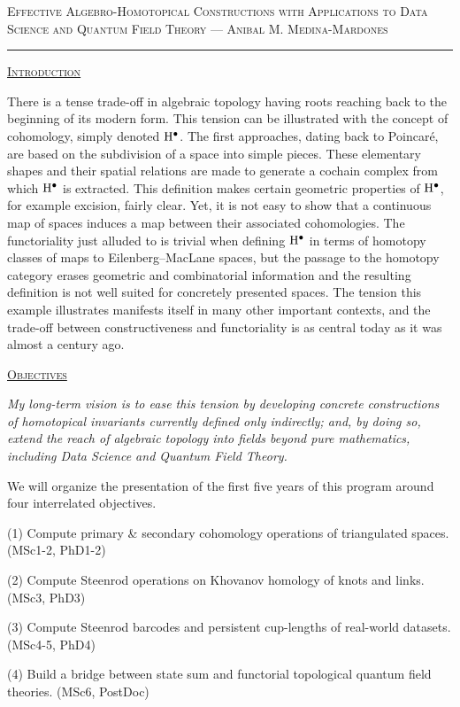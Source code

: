 
\vspace*{-9pt}

\textsc{\large Effective Algebro-Homotopical Constructions with Applications to Data Science and Quantum Field Theory}
--- \hfill \textsc{\large Anibal M. Medina-Mardones}
\hrule

\bigskip\medskip
{\centering \underline{\textsc{Introduction}}\par}

\smallskip There is a tense trade-off in algebraic topology having roots reaching back to the beginning of its modern form.
This tension can be illustrated with the concept of cohomology, simply denoted $\mathrm{H}^\bullet$.
The first approaches, dating back to Poincar\'e, are based on the subdivision of a space into simple pieces.
These elementary shapes and their spatial relations are made to generate a cochain complex from which $\mathrm{H}^\bullet$ is extracted.
This definition makes certain geometric properties of $\mathrm{H}^\bullet$, for example excision, fairly clear.
Yet, it is not easy to show that a continuous map of spaces induces a map between their associated cohomologies.
The functoriality just alluded to is trivial when defining $\mathrm{H}^\bullet$ in terms of homotopy classes of maps to Eilenberg--MacLane spaces, but the passage to the homotopy category erases geometric and combinatorial information and the resulting definition is not well suited for concretely presented spaces.
The tension this example illustrates manifests itself in many other important contexts, and the trade-off between constructiveness and functoriality is as central today as it was almost a century ago.

\smallskip
{\centering\underline{\textsc{Objectives}}\par}
\smallskip\textit{My long-term vision is to ease this tension by developing concrete constructions of homotopical invariants currently defined only indirectly; and, by doing so, extend the reach of algebraic topology into fields beyond pure mathematics, including Data Science and Quantum Field Theory.}

\smallskip We will organize the presentation of the first five years of this program around four interrelated objectives.

\smallskip
(1) Compute primary \& secondary cohomology operations of triangulated spaces. \hfill (MSc1-2, PhD1-2)\par
(2) Compute Steenrod operations on Khovanov homology of knots and links. \hfill (MSc3, PhD3)\par
(3) Compute Steenrod barcodes and persistent cup-lengths of real-world datasets. \hfill (MSc4-5, PhD4)\par
(4) Build a bridge between state sum and functorial topological quantum field theories. \hfill (MSc6, PostDoc)\par